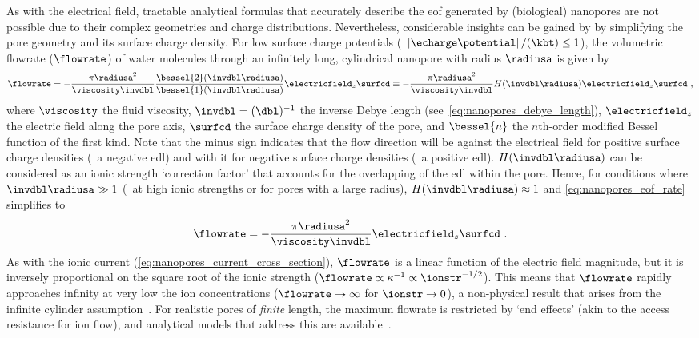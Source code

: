As with the electrical field, tractable analytical formulas that accurately describe the \gls{eof} generated
by (biological) nanopores are not possible due to their complex geometries and charge distributions.
Nevertheless, considerable insights can be gained by by simplifying the pore geometry and its surface charge
density. For low surface charge potentials (\ie~$\left| \echarge \potential\right| / (\kbt) \le 1$), the
volumetric flowrate ($\flowrate$) of water molecules through an infinitely long, cylindrical nanopore with
radius $\radiusa$ is given by~\cite{Laohakunakorn-2015}
%
\begin{equation}\label{eq:nanopores_eof_rate}
  \flowrate = - \dfrac{\pi \radiusa^2}{\viscosity \invdbl} 
  \dfrac{ \bessel{2} ( \invdbl \radiusa ) }{ \bessel{1} (\invdbl \radiusa) }
  \electricfield_z \surfcd
  \equiv - \dfrac{\pi \radiusa^2}{\viscosity \invdbl} H(\invdbl \radiusa) \electricfield_z \surfcd
  \text{ ,}
\end{equation}
%
where $\viscosity$ the fluid viscosity, $\invdbl = (\dbl)^{-1}$ the inverse Debye length
(see~\cref{eq:nanopores_debye_length}), $\electricfield_z$ the electric field along the pore axis, $\surfcd$
the surface charge density of the pore, and $\bessel{n}$ the $n$th-order modified Bessel function of the first
kind. Note that the minus sign indicates that the flow direction will be against the electrical field for
positive surface charge densities (\ie~a negative \gls{edl}) and with it for negative surface charge densities
(\ie~a positive \gls{edl}). $H(\invdbl \radiusa)$ can be considered as an ionic strength `correction factor'
that accounts for the overlapping of the \gls{edl} within the pore. Hence, for conditions where $\invdbl
\radiusa \gg 1$ (\eg~at high ionic strengths or for pores with a large radius), $H(\invdbl \radiusa) \approx
1$ and \cref{eq:nanopores_eof_rate} simplifies to
%
\begin{equation}\label{eq:nanopores_eof_rate_simple}
  \flowrate = - \dfrac{\pi \radiusa^2}{\viscosity \invdbl} \electricfield_z \surfcd
  \text{ .}
\end{equation}
%
As with the ionic current (\cref{eq:nanopores_current_cross_section}), $\flowrate$ is a linear function of the
electric field magnitude, but it is inversely proportional on the square root of the ionic strength
($\flowrate \propto \kappa^{-1} \propto \ionstr^{-1/2}$). This means that $\flowrate$ rapidly approaches
infinity at very low the ion concentrations  ($\flowrate \to \infty$ for $\ionstr \to 0$), a non-physical
result that arises from the infinite cylinder assumption~\cite{Mao-2014}. For realistic pores of \emph{finite}
length, the maximum flowrate is restricted by `end effects' (akin to the access resistance for ion flow), and
analytical models that address this are available~\cite{Sherwood-2014}.

